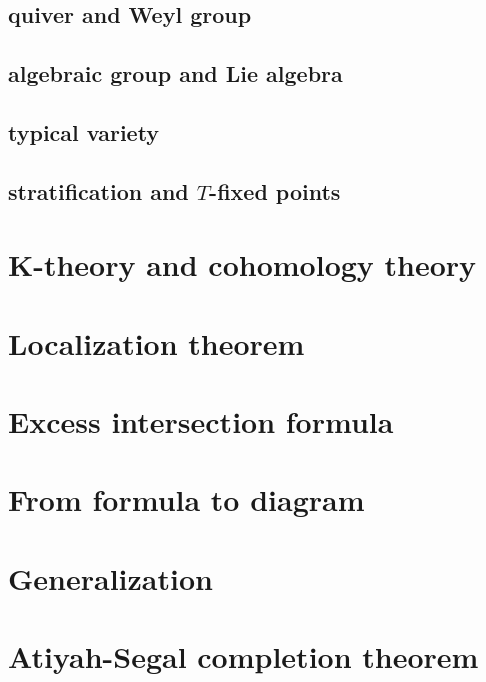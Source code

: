 \documentclass[reqno,11pt]{book}
\numberwithin{equation}{section}
\theoremstyle{plain}
\theoremstyle{plain}
\numberwithin{equation}{section}
\theoremstyle{remark}
\begin{document}
\section{quiver and Weyl group}
\section{algebraic group and Lie algebra}
\section{typical variety}
\section{stratification and $T$-fixed points}
\chapter{K-theory and cohomology theory}
\chapter{Localization theorem}

\chapter{Excess intersection formula}

\chapter{From formula to diagram}


\chapter{Generalization}

\chapter{Atiyah-Segal completion theorem}


%
%
\end{document}
